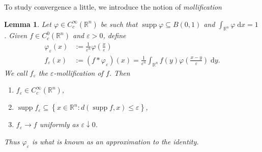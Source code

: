 \documentclass{book}
\newcommand{\bbR}{\mathbb{R}}
\renewcommand{\d}{\mathrm{d}}
\renewcommand{\epsilon}{\varepsilon}
\renewcommand{\phi}{\varphi}
\newcommand{\set}[1]{\left\{ {#1} \right\}}
\DeclareMathOperator{\supp}{supp}
\newtheorem{lemma}[theorem]{Lemma}
\theoremstyle{definition}
\theoremstyle{remark}
\numberwithin{equation}{chapter}
\begin{document}
To study convergence a little, we introduce the notion of \textit{mollification}
\begin{lemma}
    Let $\phi \in C_c^\infty(\bbR^n)$ be such that $\supp{\phi} \subseteq B(0,1)$ and $\int_{\bbR^n} \phi \; \d x = 1$. Given $f \in C_c^0(\bbR^n)$ and $\epsilon > 0$, define
    \begin{align}
        \phi_\epsilon(x) &:= \frac{1}{\epsilon^n}\phi\left(\frac{x}{\epsilon}\right) \\
           f_\epsilon(x) &:= (f \ast \phi_\epsilon)(x) = \frac{1}{\epsilon^n} \int_{\bbR^n} f(y)\phi\left(\frac{x-y}{\epsilon}\right) \; \d y. \label{eq:mollificationOfAContinuousCompactlySupportedFunction}
    \end{align}
    We call $f_\epsilon$ the $\epsilon$-\textit{mollification of} $f$. Then
    \begin{enumerate}[label=\rm{(\roman*)}]
        \item $f_\epsilon \in C_c^\infty(\bbR^n)$,
        \item $\supp{f_\epsilon} \subseteq \set{ x \in \bbR^n : d(\supp{f},x) \leq \epsilon}$,
        \item $f_\epsilon \rightarrow f$ uniformly as $\epsilon \downarrow 0$.
    \end{enumerate}
    Thus $\phi_\epsilon$ is what is known as an \textit{approximation to the identity}.
\end{lemma}
\end{document}

